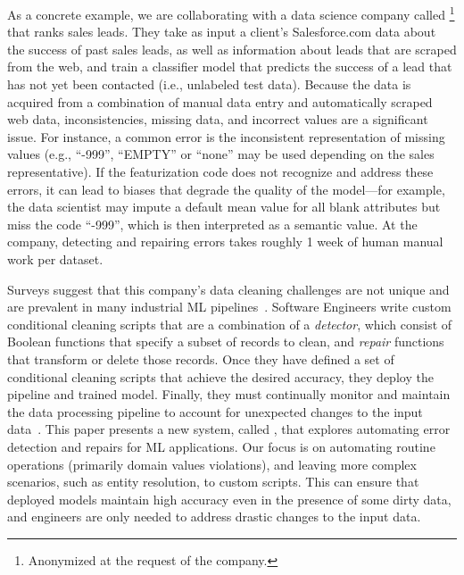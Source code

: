 As a concrete example, we are collaborating with a data science company called \company\footnote{Anonymized at the request of the company.} that ranks sales leads. They take as input a client's Salesforce.com data about the success of past sales leads, as well as information about  leads that are scraped from the web, and train a classifier model that predicts the success of a lead that has not yet been contacted (i.e., unlabeled test data).  Because the data is acquired from a combination of manual data entry and automatically scraped web data, inconsistencies, missing data, and incorrect values are a significant issue.  For instance, a common error is the inconsistent representation of missing values (e.g., ``-999'', ``EMPTY'' or ``none'' may be used depending on the sales representative).  If the featurization code does not recognize and address these errors, it can lead to biases that degrade the quality of the model---for example, the data scientist may impute a default mean value for all blank attributes but miss the code ``-999'', which is then interpreted as a semantic value. 
At the company, detecting and repairing errors takes roughly 1 week of human manual work per dataset. 

Surveys suggest that this company's data cleaning challenges are not unique and are prevalent in many industrial ML pipelines~\cite{krishnan2016hilda}.  
Software Engineers write custom conditional cleaning scripts that are a combination of a {\it detector}, which consist of Boolean functions that specify a subset of records to clean, and {\it repair} functions that transform or delete those records.  Once they have defined a set of conditional cleaning scripts that achieve the desired accuracy, they deploy the pipeline and trained model.  Finally, they must continually monitor and maintain the data processing pipeline to account for unexpected changes to the input data~\cite{sculley2014machine, DBLP:conf/sigmod/KrishnanFGWW16}.
This paper presents a new system, called \sys, that explores automating error detection and repairs for ML applications.   
Our focus is on automating routine operations (primarily domain values violations), and leaving more complex scenarios, such as entity resolution, to custom scripts.
This can ensure that deployed models maintain high accuracy even in the presence of some dirty data, and engineers are only needed to address drastic changes to the input data. 

